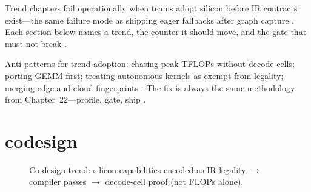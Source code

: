 Trend chapters fail operationally when teams adopt silicon before IR contracts exist---the same failure mode as shipping eager fallbacks after graph capture \citep{nvidia2024cudagraphs,memoryfloor2026,yirage2026,chen2020compilerbasedhardw,patel2025llminference,kwon2023vllm,liu2024deepseekv3,taxbreak2026,amd2024aie,dlbook,semianalysis2024tma,amd2024xdna,dao2022flashattention,dao2023flashdecoding,nvidia2024cudagraphs,nvidia2022hopper}. Each section below names a trend, the counter it should move, and the gate that must not break \citep{patel2025llminference,memoryfloor2026,taxbreak2026,yirage2026,chen2020compilerbasedhardw,kwon2023vllm,liu2024deepseekv3,amd2024aie,dlbook,semianalysis2024tma,amd2024xdna,dao2022flashattention,dao2023flashdecoding,nvidia2024cudagraphs,nvidia2022hopper,amd2024xdna}.

Anti-patterns for trend adoption: chasing peak TFLOPs without decode cells; porting GEMM first; treating autonomous kernels as exempt from legality; merging edge and cloud fingerprints \citep{patel2025llminference,yirage2026,chen2020compilerbasedhardw,memoryfloor2026,taxbreak2026,kwon2023vllm,liu2024deepseekv3,amd2024aie,dlbook,semianalysis2024tma,amd2024xdna,dao2022flashattention,dao2023flashdecoding,nvidia2024cudagraphs,nvidia2022hopper,amd2024xdna}. The fix is always the same methodology from Chapter~22---profile, gate, ship \citep{yirage2026,chen2020compilerbasedhardw,patel2025llminference,memoryfloor2026,taxbreak2026,kwon2023vllm,liu2024deepseekv3,amd2024aie,dlbook,semianalysis2024tma,amd2024xdna,dao2022flashattention,dao2023flashdecoding,nvidia2024cudagraphs,nvidia2022hopper,amd2024xdna}.

\section{codesign}
\label{sec:ch27_codesign}


\begin{figure}[t]
\centering
{}
\caption{Co-design trend: silicon capabilities encoded as IR legality $\rightarrow$ compiler passes $\rightarrow$ decode-cell proof (not FLOPs alone).}
\label{fig:codesign_pipeline}
\end{figure}

